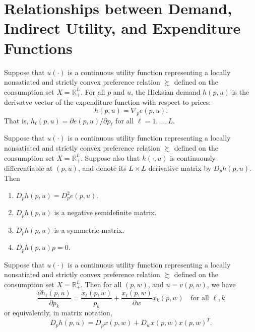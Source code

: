 \section{Relationships between Demand, Indirect Utility, and Expenditure Functions}

\begin{prop}
    Suppose that $u(\cdot)$ is a continuous utility function representing a locally nonsatiated and strictly convex preference relation $\succsim$ defined on the consumption set $X = \mathbb{R}^L_+$. For all $p$ and $u$, the Hicksian demand $h(p, u)$ is the derivatve vector of the expenditure function with respect to prices:
    \begin{equation*}
        h(p, u) = \nabla_p e(p, u).
    \end{equation*}
    That is, $h_\ell (p, u) = \partial e(p, u) / \partial p_\ell$ for all $\ell = 1, \dots, L$.
\end{prop}

\begin{prop}
    Suppose that $u(\cdot)$ is a continuous utility function representing a locally nonsatiated and strictly convex preference relation $\succsim$ defined on the consumption set $X = \mathbb{R}^L_+$. Suppose also that $h(\cdot, u)$ is continuously differentiable at $(p, u)$, and denote its $L \times L$ derivative matrix by $D_p h(p, u)$. Then
    \begin{enumerate}
        \item $D_p h(p, u) = D_p^2 e(p, u).$
        \item $D_p h(p, u)$ is a negative semidefinite matrix.
        \item $D_p h(p, u)$ is a symmetric matrix.
        \item $D_p h(p, u) p = 0$.
    \end{enumerate}
\end{prop}

\begin{prop}
    Suppose that $u(\cdot)$ is a continuous utility function representing a locally nonsatiated and strictly convex preference relation $\succsim$ defined on the consumption set $X = \mathbb{R}^L_+$. Then for all $(p, w)$, and $u = v(p, w)$, we have 
    \begin{equation*}
        \frac{\partial h_\ell (p, u)}{\partial p_k} = \frac{x_\ell (p, w)}{p_k} + \frac{x_\ell (p, w)}{\partial w} x_k (p, w) \quad \text{for all } \ell, k
    \end{equation*}
    or equivalently, in matrix notation,
    \begin{equation*}
        D_p h(p, u) = D_p x(p, w) + D_w x(p, w) x(p, w)^T.
    \end{equation*}
\end{prop}

